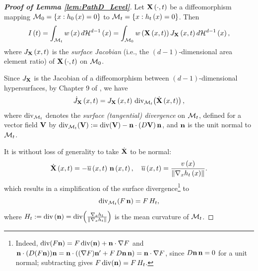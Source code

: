 \documentclass[12pt,american]{article}
\theoremstyle{definition}
\theoremstyle{plain}
\theoremstyle{definition}
\theoremstyle{plain}
\theoremstyle{plain}
\theoremstyle{plain}
\theoremstyle{plain}
\theoremstyle{plain}
\newcommand{\norm}[1]{\left\| #1 \right\|}
\begin{document}
\begin{proof}[\textbf{Proof of Lemma \ref{lem:PathD_Level}}]
\label{proof:PathD_Level_alt}
Let ${\bf X}\left(\cdot,t\right)$ be a diffeomorphism
mapping ${\cal M}_{0}=\left\{ x:h_{0}\left(x\right)=0\right\} $
to ${\cal M}_{t}=\left\{ x:h_{t}\left(x\right)=0\right\} $.
Then
\begin{equation}\label{eq:It_alt}
I\left(t\right)=\int_{{\cal M}_{t}}w\left(x\right)d{\cal H}^{d-1}\left(x\right)
=\int_{{\cal M}_{0}}w\left({\bf X}\left(x,t\right)\right)J_{{\bf X}}\left(x,t\right)d{\cal H}^{d-1}\left(x\right),
\end{equation}
where $J_{{\bf X}}\left(x,t\right)$ is the \emph{surface Jacobian} (i.e., the $(d-1)$-dimensional
area element ratio) of ${\bf X}\left(\cdot,t\right)$ on ${\cal M}_0$.

Since $J_{{\bf X}}$ is the Jacobian of a diffeomorphism between $(d-1)$-dimensional
hypersurfaces, by Chapter 9 of \citet*{delfour2001shapes}, we have
\begin{equation}\label{eq:surfJac_transport}
\dot{J}_{{\bf X}}\left(x,t\right)=J_{{\bf X}}\left(x,t\right)\,
\text{div}_{{\cal M}_{t}}\!\left(\dot{{\bf X}}\left(x,t\right)\right),
\end{equation}
where $\text{div}_{{\cal M}_{t}}$ denotes the \emph{surface (tangential) divergence} on ${\cal M}_t$,
defined for a vector field ${\bf V}$ by
$\text{div}_{{\cal M}_{t}}\!\left({\bf V}\right)
:=\text{div}\!\left({\bf V}\right)-{\bf n}\cdot\left(D{\bf V}\right){\bf n}$,
and ${\bf n}$ is the unit normal to ${\cal M}_t$.

It is without loss of generality to take $\dot{{\bf X}}$ to be
normal:
\[
\dot{{\bf X}}\left(x,t\right)=-\ol u\left(x,t\right)\,{\bf n}\left(x,t\right),
\quad \ol u\left(x,t\right)=\frac{v\left(x\right)}{\norm{\Dif_{x}h_{t}\left(x\right)}}.
\]
which results in a simplification of the surface divergence\footnote{Indeed, $\text{div}(F{\bf n})=F\,\text{div}({\bf n})+{\bf n}\cdot\nabla F$
and ${\bf n}\cdot(D(F{\bf n})){\bf n}={\bf n}\cdot((\nabla F){\bf n}'+F\,D{\bf n}\,{\bf n})={\bf n}\cdot\nabla F$,
since $D{\bf n}\,{\bf n}=0$ for a unit normal; subtracting gives $F\,\text{div}({\bf n})=F\,H_t$.} to
\begin{equation}\label{eq:divM_normal}
\text{div}_{{\cal M}_{t}}\!\left(F\,{\bf n}\right)=F\,H_{t},
\end{equation}
where $H_t:=\text{div}\left({\bf n}\right)=\text{div}\!\left(\frac{\Dif_{x}h_{t}}{\norm{\Dif_{x}h_{t}}}\right)$
is the mean curvature of ${\cal M}_t$.


\end{proof}
\end{document}
